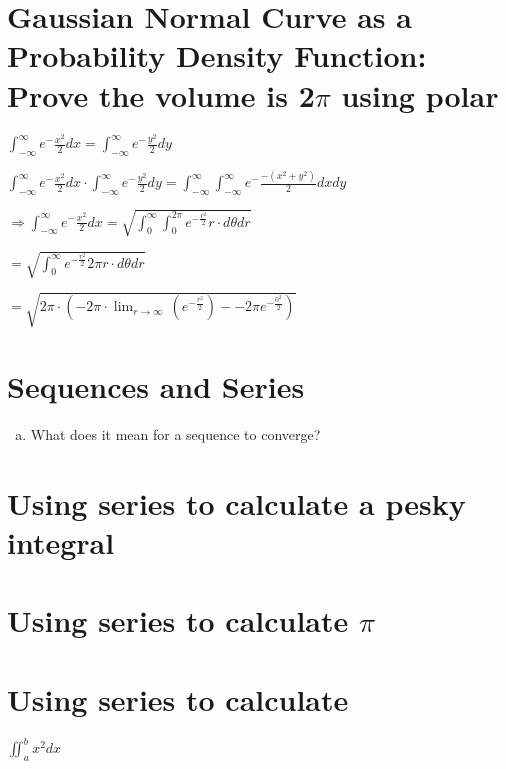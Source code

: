 \documentclass{article}
\begin{document}
\section{Gaussian Normal Curve as a Probability Density Function: Prove the volume is 2$\pi$ using polar}

    $\int_{-\infty}^{\infty} e^-\frac{x^2}{2} dx = \int_{-\infty}^{\infty} e^-\frac{y^2}{2} dy $

    $\int_{-\infty}^{\infty} e^-\frac{x^2}{2} dx \cdot \int_{-\infty}^{\infty} e^-\frac{y^2}{2} dy = \int_{-\infty}^{\infty} \int_{-\infty}^{\infty} e^-\frac{-(x^2+y^2)}{2} dx dy $

    $\Rightarrow \int_{-\infty}^{\infty} e^-\frac{x^2}{2} dx = \sqrt{\int_{0}^{\infty} \int_{0}^{2\pi} e^{-\frac{r^2}{2}} r \cdot d\theta dr }$

    $ = \sqrt{\int_{0}^{\infty} e^{-\frac{r^2}{2}} 2\pi r \cdot d\theta dr} $

    $ = \sqrt{2\pi \cdot (-2\pi \cdot \lim _{r\to \infty \:}\left(e^{-\frac{r^2}{2}}\right) - -2\pi e^{-\frac{0^2}{2}})}$

\section{Sequences and Series}

\begin{enumerate}[a.]
	\item What does it mean for a sequence to converge?

\end{enumerate}

\section{Using series to calculate a pesky integral}

\section{Using series to calculate $\pi$}

\section{Using series to calculate}

$\iint_{a}^{b} x^2 dx$
\end{document}
